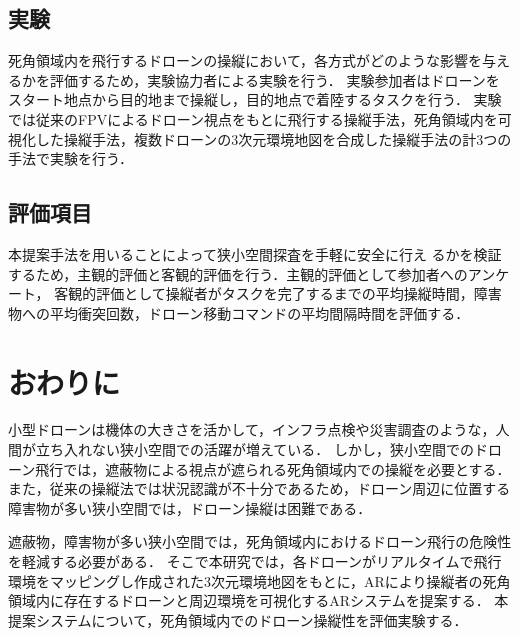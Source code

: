 \documentclass[a4paper,10pt,twocolumn,uplatex]{jsarticle}
\begin{document}

\subsection{実験}
死角領域内を飛行するドローンの操縦において，各方式がどのような影響を与えるかを評価するため，実験協力者による実験を行う．
実験参加者はドローンをスタート地点から目的地まで操縦し，目的地点で着陸するタスクを行う．
実験では従来のFPVによるドローン視点をもとに飛行する操縦手法，死角領域内を可視化した操縦手法，複数ドローンの3次元環境地図を合成した操縦手法の計3つの手法で実験を行う．



\subsection{評価項目}
本提案手法を用いることによって狭小空間探査を手軽に安全に行え
るかを検証するため，主観的評価と客観的評価を行う．主観的評価として参加者へのアンケート，
客観的評価として操縦者がタスクを完了するまでの平均操縦時間，障害物への平均衝突回数，ドローン移動コマンドの平均間隔時間を評価する．


\section{おわりに}

小型ドローンは機体の大きさを活かして，インフラ点検や災害調査のような，人間が立ち入れない狭小空間での活躍が増えている．
しかし，狭小空間でのドローン飛行では，遮蔽物による視点が遮られる死角領域内での操縦を必要とする．
また，従来の操縦法では状況認識が不十分であるため，ドローン周辺に位置する障害物が多い狭小空間では，ドローン操縦は困難である．\par
遮蔽物，障害物が多い狭小空間では，死角領域内におけるドローン飛行の危険性を軽減する必要がある．
そこで本研究では，各ドローンがリアルタイムで飛行環境をマッピングし作成された3次元環境地図をもとに，ARにより操縦者の死角領域内に存在するドローンと周辺環境を可視化するARシステムを提案する．
本提案システムについて，死角領域内でのドローン操縦性を評価実験する．
\end{document}
